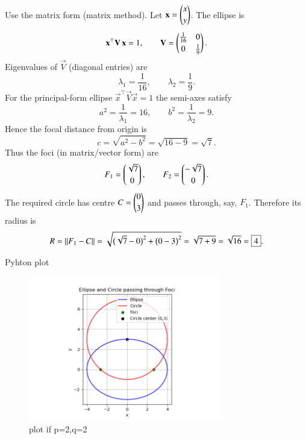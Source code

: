 \documentclass[journal]{IEEEtran}
\begin{document}
\solution\\[-2mm]
Use the matrix form (matrix method). Let $\mathbf{x}=\begin{pmatrix}x\\[2pt]y\end{pmatrix}$. The ellipse is
\[
\mathbf{x}^\top \mathbf{V}\,\mathbf{x}=1,\qquad
\mathbf{V}=\begin{pmatrix}\frac{1}{16} & 0\\[2pt]0 & \frac{1}{9}\end{pmatrix}.
\]
Eigenvalues of $\vec{V}$ (diagonal entries) are
\[
\lambda_1=\frac{1}{16},\qquad \lambda_2=\frac{1}{9}.
\]
For the principal-form ellipse $\vec{x}^\top\vec{V}\vec{x}=1$ the semi-axes satisfy
\[
a^2=\frac{1}{\lambda_1}=16,\qquad b^2=\frac{1}{\lambda_2}=9.
\]
Hence the focal distance from origin is
\[
c=\sqrt{a^2-b^2}=\sqrt{16-9}=\sqrt{7}.
\]
Thus the foci (in matrix/vector form) are
\[
F_1=\begin{pmatrix}\sqrt{7}\\[2pt]0\end{pmatrix},\qquad F_2=\begin{pmatrix}-\sqrt{7}\\[2pt]0\end{pmatrix}.
\]
The required circle has centre $C=\begin{pmatrix}0\\[2pt]3\end{pmatrix}$ and passes through, say, $F_1$. Therefore its radius is
\[
R=\left\lVert F_1-C\right\rVert
=\sqrt{\bigl(\sqrt{7}-0\bigr)^2+\bigl(0-3\bigr)^2}
=\sqrt{7+9}
=\sqrt{16}
=\boxed{4}.
\]
\begin{frame}{Pyhton plot}
\begin{figure}[h!]
    \centering
    \includegraphics[width=0.75\textwidth]{figs/15.png}
    \caption{plot if p=2,q=2}
    \label{fig:example_image}
\end{figure}
\end{frame}
\end{document}
